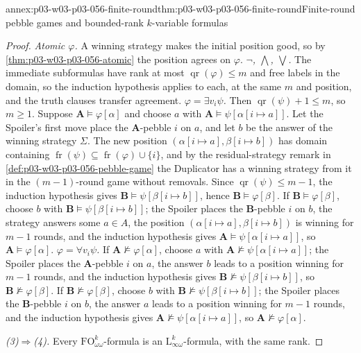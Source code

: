 \begin{annexitem}{annex:p03-w03-p03-056-finite-round}{thm:p03-w03-p03-056-finite-round}{Finite-round pebble games and bounded-rank \(k\)-variable formulas}
\begin{proof}
\emph{Atomic \(\varphi\).} A winning strategy makes the initial position
good, so by \cref{thm:p03-w03-p03-056-atomic} the position agrees on
\(\varphi\).
\emph{\(\neg\), \(\bigwedge\), \(\bigvee\).} The immediate subformulas have
rank at most \(\operatorname{qr}(\varphi)\leq m\) and free labels in the
domain, so the induction hypothesis applies to each, at the same \(m\) and
position, and the truth clauses transfer agreement.
\emph{\(\varphi=\exists v_i\psi\).} Then
\(\operatorname{qr}(\psi)+1\leq m\), so \(m\geq1\). Suppose
\(\mathbf A\models\varphi[\alpha]\) and choose \(a\) with
\(\mathbf A\models\psi[\alpha[i\mapsto a]]\). Let the Spoiler's first move
place the \(\mathbf A\)-pebble \(i\) on \(a\), and let \(b\) be the answer of
the winning strategy \(\Sigma\). The new position
\((\alpha[i\mapsto a],\beta[i\mapsto b])\) has domain containing
\(\operatorname{fr}(\psi)\subseteq\operatorname{fr}(\varphi)\cup\{i\}\), and
by the residual-strategy remark in \cref{def:p03-w03-p03-056-pebble-game}
the Duplicator has a winning strategy from it in the \((m-1)\)-round game
without removals. Since \(\operatorname{qr}(\psi)\leq m-1\), the induction
hypothesis gives \(\mathbf B\models\psi[\beta[i\mapsto b]]\), hence
\(\mathbf B\models\varphi[\beta]\). If \(\mathbf B\models\varphi[\beta]\),
choose \(b\) with \(\mathbf B\models\psi[\beta[i\mapsto b]]\); the Spoiler
places the \(\mathbf B\)-pebble \(i\) on \(b\), the strategy answers some
\(a\in A\), the position \((\alpha[i\mapsto a],\beta[i\mapsto b])\) is
winning for \(m-1\) rounds, and the induction hypothesis gives
\(\mathbf A\models\psi[\alpha[i\mapsto a]]\), so
\(\mathbf A\models\varphi[\alpha]\).
\emph{\(\varphi=\forall v_i\psi\).} If \(\mathbf A\not\models\varphi[\alpha]\),
choose \(a\) with \(\mathbf A\not\models\psi[\alpha[i\mapsto a]]\); the
Spoiler places the \(\mathbf A\)-pebble \(i\) on \(a\), the answer \(b\)
leads to a position winning for \(m-1\) rounds, and the induction hypothesis
gives \(\mathbf B\not\models\psi[\beta[i\mapsto b]]\), so
\(\mathbf B\not\models\varphi[\beta]\). If
\(\mathbf B\not\models\varphi[\beta]\), choose \(b\) with
\(\mathbf B\not\models\psi[\beta[i\mapsto b]]\); the Spoiler places the
\(\mathbf B\)-pebble \(i\) on \(b\), the answer \(a\) leads to a position
winning for \(m-1\) rounds, and the induction hypothesis gives
\(\mathbf A\not\models\psi[\alpha[i\mapsto a]]\), so
\(\mathbf A\not\models\varphi[\alpha]\).

\emph{(3)\(\Rightarrow\)(4).} Every \(\mathrm{FO}^k_{\omega\omega}\)-formula is
an \(\mathrm{L}^k_{\infty\omega}\)-formula, with the same rank.


\end{proof}
\end{annexitem}
